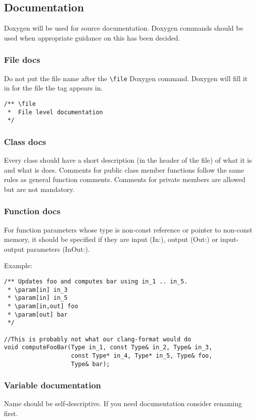 \subsection{Documentation}
Doxygen will be used for source documentation. Doxygen commands should be used when appropriate guidance on this has been decided.

\subsubsection{File docs}
Do not put the file name after the \verb|\file| Doxygen command. Doxygen will fill it in for the file the tag appears in.
\begin{lstlisting}
/** \file
 *  File level documentation 
 */
\end{lstlisting}

\subsubsection{Class docs}
Every class should have a short description (in the header of the file) of what it is and what is does.
Comments for public class member functions follow the same rules as general function comments.
Comments for private members are allowed but are not mandatory.

\subsubsection{Function docs}
For function parameters whose type is non-const reference or pointer to non-const memory,
it should be specified if they are input (In:), output (Out:) or input-output parameters (InOut:).

Example:
\begin{lstlisting}
/** Updates foo and computes bar using in_1 .. in_5.
 * \param[in] in_3
 * \param[in] in_5
 * \param[in,out] foo
 * \param[out] bar
 */

//This is probably not what our clang-format would do
void computeFooBar(Type in_1, const Type& in_2, Type& in_3,
                   const Type* in_4, Type* in_5, Type& foo,
                   Type& bar);
\end{lstlisting}

\subsubsection{Variable documentation}
Name should be self-descriptive.  If you need documentation consider renaming first.

